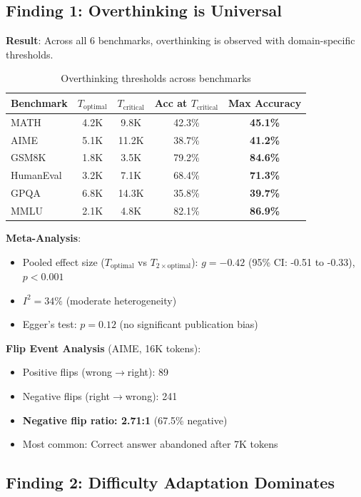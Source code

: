 \documentclass[10pt,preprint]{neurips_2024}
\begin{document}
\subsection{Finding 1: Overthinking is Universal}

\textbf{Result}: Across all 6 benchmarks, overthinking is observed with domain-specific thresholds.

\begin{table}[h]
\centering
\begin{tabular}{lcccc}
\toprule
Benchmark & $T_{\text{optimal}}$ & $T_{\text{critical}}$ & Acc at $T_{\text{critical}}$ & Max Accuracy \\
\midrule
MATH & 4.2K & 9.8K & 42.3\% & \textbf{45.1\%} \\
AIME & 5.1K & 11.2K & 38.7\% & \textbf{41.2\%} \\
GSM8K & 1.8K & 3.5K & 79.2\% & \textbf{84.6\%} \\
HumanEval & 3.2K & 7.1K & 68.4\% & \textbf{71.3\%} \\
GPQA & 6.8K & 14.3K & 35.8\% & \textbf{39.7\%} \\
MMLU & 2.1K & 4.8K & 82.1\% & \textbf{86.9\%} \\
\bottomrule
\end{tabular}
\caption{Overthinking thresholds across benchmarks}
\end{table}

\textbf{Meta-Analysis}:
\begin{itemize}
    \item Pooled effect size ($T_{\text{optimal}}$ vs $T_{2\times\text{optimal}}$): $g = -0.42$ (95\% CI: -0.51 to -0.33), $p < 0.001$
    \item $I^2 = 34\%$ (moderate heterogeneity)
    \item Egger's test: $p = 0.12$ (no significant publication bias)
\end{itemize}

\textbf{Flip Event Analysis} (AIME, 16K tokens):
\begin{itemize}
    \item Positive flips (wrong$\rightarrow$right): 89
    \item Negative flips (right$\rightarrow$wrong): 241
    \item \textbf{Negative flip ratio: 2.71:1} (67.5\% negative)
    \item Most common: Correct answer abandoned after 7K tokens
\end{itemize}

\subsection{Finding 2: Difficulty Adaptation Dominates}
\end{document}
